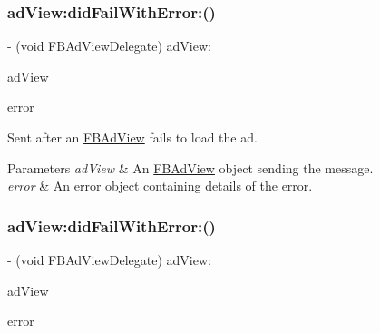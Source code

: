 \subsubsection{\texorpdfstring{ad\+View\+:did\+Fail\+With\+Error\+:()}{adView:didFailWithError:()}\hspace{0.1cm}{\footnotesize\ttfamily [4/5]}}
{\footnotesize\ttfamily -\/ (void F\+B\+Ad\+View\+Delegate) ad\+View\+: \begin{DoxyParamCaption}\item[{(\hyperlink{interfaceFBAdView}{F\+B\+Ad\+View} $\ast$)}]{ad\+View }\item[{didFailWithError:(N\+S\+Error $\ast$)}]{error }\end{DoxyParamCaption}\hspace{0.3cm}{\ttfamily [optional]}}

Sent after an \hyperlink{interfaceFBAdView}{F\+B\+Ad\+View} fails to load the ad.


\begin{DoxyParams}{Parameters}
{\em ad\+View} & An \hyperlink{interfaceFBAdView}{F\+B\+Ad\+View} object sending the message. \\
\hline
{\em error} & An error object containing details of the error. \\
\hline
\end{DoxyParams}
\mbox{\label{protocolFBAdViewDelegate_01-p_a2fc4eecd46ddc75a41e925c9b07d25b8}} 
\subsubsection{\texorpdfstring{ad\+View\+:did\+Fail\+With\+Error\+:()}{adView:didFailWithError:()}\hspace{0.1cm}{\footnotesize\ttfamily [5/5]}}
{\footnotesize\ttfamily -\/ (void F\+B\+Ad\+View\+Delegate) ad\+View\+: \begin{DoxyParamCaption}\item[{(\hyperlink{interfaceFBAdView}{F\+B\+Ad\+View} $\ast$)}]{ad\+View }\item[{didFailWithError:(N\+S\+Error $\ast$)}]{error }\end{DoxyParamCaption}\hspace{0.3cm}{\ttfamily [optional]}}

